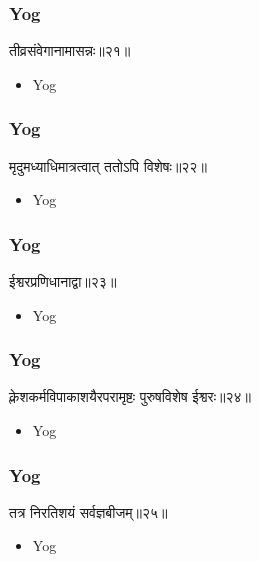\begin{frame}[fragile]\frametitle{Yog}
\begin{sanskrit}
तीव्रसंवेगानामासन्नः॥२१॥
\end{sanskrit}
	\begin{itemize}
	\item Yog 
	\end{itemize}
\end{frame}


\begin{frame}[fragile]\frametitle{Yog}
\begin{sanskrit}
मृदुमध्याधिमात्रत्वात् ततोऽपि विशेषः॥२२॥
\end{sanskrit}
	\begin{itemize}
	\item Yog 
	\end{itemize}
\end{frame}


\begin{frame}[fragile]\frametitle{Yog}
\begin{sanskrit}
ईश्वरप्रणिधानाद्वा॥२३॥
\end{sanskrit}
	\begin{itemize}
	\item Yog 
	\end{itemize}
\end{frame}

\begin{frame}[fragile]\frametitle{Yog}
\begin{sanskrit}
क्लेशकर्मविपाकाशयैरपरामृष्टः पुरुषविशेष ईश्वरः॥२४॥
\end{sanskrit}
	\begin{itemize}
	\item Yog 
	\end{itemize}
\end{frame}

\begin{frame}[fragile]\frametitle{Yog}
\begin{sanskrit}
तत्र निरतिशयं सर्वज्ञबीजम्॥२५॥
\end{sanskrit}
	\begin{itemize}
	\item Yog 
	\end{itemize}
\end{frame}

